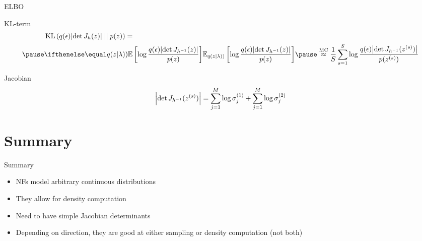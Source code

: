 \begin{frame}{ELBO}
\begin{small}
\begin{block}{KL-term}
\begin{equation*}
\begin{aligned}
&\KL{q(\epsilon)\djac{h}{z}}{p(z)} = \\ \pause
&\E[q(z|\lambda))]{\log\frac{q(\epsilon)\djac{h^{-1}}{z}}{p(z)}} \pause \overset{\text{MC}}{\approx} \frac{1}{S}\sum_{s=1}^{S} \log\frac{q(\epsilon)\djac{h^{-1}}{z^{(s)}}}{p(z^{(s)})}
\end{aligned}
\end{equation*}
\end{block}
\pause
\begin{block}{Jacobian}
\pause
\begin{equation*}
\abs{\det J_{h^{-1}}(z^{(s)})} = \sum_{j=1}^{M}\log\sigma^{(1)}_{j} + \sum_{j=1}^{M}\log\sigma^{(2)}_{j}
\end{equation*}
\end{block}
\end{small}
\end{frame}


\section{Summary}

\begin{frame}{Summary}
\begin{itemize}
\item NFs model arbitrary continuous distributions
\item They allow for density computation
\item Need to have simple Jacobian determinants
\item Depending on direction, they are good at either sampling or density computation (not both)
\end{itemize}
\end{frame}

